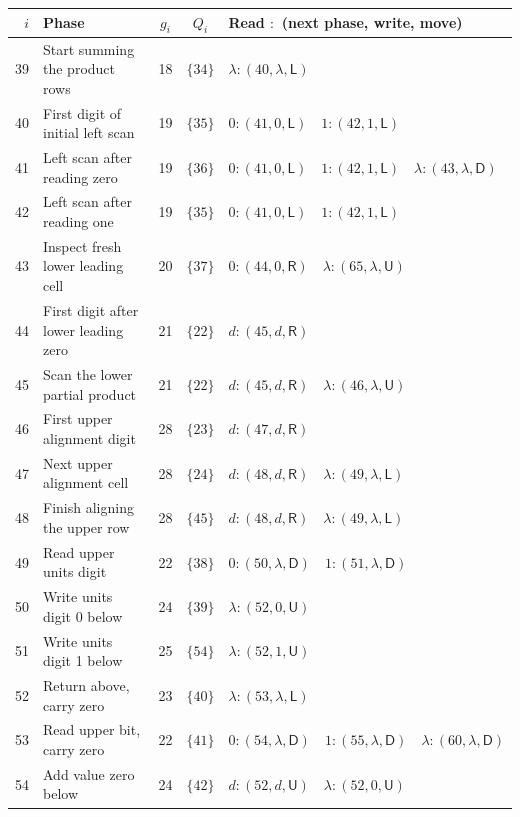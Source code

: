 \documentclass[11pt,a4paper]{article}
\newcommand{\blank}{\lambda}
\newcommand{\triple}[3]{(#1,#2,\mathsf{#3})}
\begin{document}
\begin{center}
\fontsize{9.2}{11}\selectfont\renewcommand{\arraystretch}{1.23}
\setlength{\tabcolsep}{4pt}
\begin{tabularx}{\textwidth}{r p{6cm} c c X}
\toprule\rowcolor{Pale}$i$ & Phase & $g_i$ & $Q_i$ & Read $:$ (next phase, write, move)\\\midrule
39 & Start summing the product rows & 18 & $\{34\}$ & $\blank:\triple{40}{\blank}{L}$ \\
40 & First digit of initial left scan & 19 & $\{35\}$ & $0:\triple{41}{0}{L}\quad 1:\triple{42}{1}{L}$ \\
41 & Left scan after reading zero & 19 & $\{36\}$ & $0:\triple{41}{0}{L}\quad 1:\triple{42}{1}{L}\quad \blank:\triple{43}{\blank}{D}$ \\
42 & Left scan after reading one & 19 & $\{35\}$ & $0:\triple{41}{0}{L}\quad 1:\triple{42}{1}{L}$ \\
43 & Inspect fresh lower leading cell & 20 & $\{37\}$ & $0:\triple{44}{0}{R}\quad \blank:\triple{65}{\blank}{U}$ \\
44 & First digit after lower leading zero & 21 & $\{22\}$ & $d:\triple{45}{d}{R}$ \\
45 & Scan the lower partial product & 21 & $\{22\}$ & $d:\triple{45}{d}{R}\quad \blank:\triple{46}{\blank}{U}$ \\
46 & First upper alignment digit & 28 & $\{23\}$ & $d:\triple{47}{d}{R}$ \\
47 & Next upper alignment cell & 28 & $\{24\}$ & $d:\triple{48}{d}{R}\quad \blank:\triple{49}{\blank}{L}$ \\
48 & Finish aligning the upper row & 28 & $\{45\}$ & $d:\triple{48}{d}{R}\quad \blank:\triple{49}{\blank}{L}$ \\
49 & Read upper units digit & 22 & $\{38\}$ & $0:\triple{50}{\blank}{D}\quad 1:\triple{51}{\blank}{D}$ \\
50 & Write units digit 0 below & 24 & $\{39\}$ & $\blank:\triple{52}{0}{U}$ \\
51 & Write units digit 1 below & 25 & $\{54\}$ & $\blank:\triple{52}{1}{U}$ \\
52 & Return above, carry zero & 23 & $\{40\}$ & $\blank:\triple{53}{\blank}{L}$ \\
53 & Read upper bit, carry zero & 22 & $\{41\}$ & $0:\triple{54}{\blank}{D}\quad 1:\triple{55}{\blank}{D}\quad \blank:\triple{60}{\blank}{D}$ \\
54 & Add value zero below & 24 & $\{42\}$ & $d:\triple{52}{d}{U}\quad \blank:\triple{52}{0}{U}$ \\

\end{tabularx}
\end{center}
\end{document}
